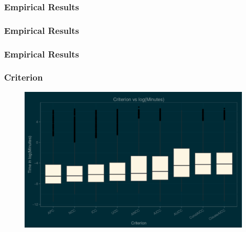 \begin{frame}
  \frametitle{Empirical Results}
  \begin{center}


\end{center}
\end{frame}

\begin{frame}
  \frametitle{Empirical Results}
  \begin{center}


\end{center}
\end{frame}

\begin{frame}
  \frametitle{Empirical Results}
  \begin{center}


\end{center}
\end{frame}

% 
% 

\begin{frame}
\frametitle{Criterion}
\begin{figure}
\includegraphics[width=\textwidth]{CriterionBox}
\end{figure}

\vspace{-.10in}
\begin{figure}
\begin{centering}
\end{centering}
\end{figure}

\end{frame}

